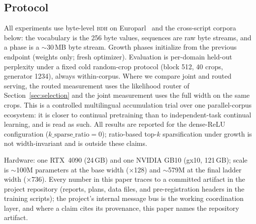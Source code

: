\documentclass[11pt]{article}
\theoremstyle{definition}\newtheorem{definition}{Definition}
\theoremstyle{remark}\newtheorem{remark}{Remark}
\newcommand{\BDH}{\textsc{bdh}}
\begin{document}
\subsection{Protocol}
\label{sec:protocol}

All experiments use byte-level \BDH{} on Europarl~\cite{europarl} and the cross-script corpora below: the vocabulary is the 256 byte values, sequences are
raw byte streams, and a phase is a $\sim$30\,MB byte stream. Growth phases initialize from
the previous endpoint (weights only; fresh optimizer). Evaluation is per-domain held-out
perplexity under a fixed cold random-crop protocol (block 512, 40 crops, generator 1234),
always within-corpus. Where we compare joint and routed serving, the routed measurement uses
the likelihood router of Section~\ref{sec:selection} and the joint measurement uses the full
width on the same crops. This is a controlled multilingual accumulation trial over one parallel-corpus
ecosystem: it is closer to continual pretraining than to independent-task continual learning, and
is read as such. All results are reported for the dense-ReLU configuration
($k\_\mathrm{sparse\_ratio}=0$); ratio-based top-$k$ sparsification under growth is not width-invariant
and is outside these claims.

Hardware: one RTX~4090 (24\,GB) and one NVIDIA GB10 (gx10, 121\,GB); scale is $\sim$100M
parameters at the base width ($\times$128) and $\sim$579M at the final ladder width
($\times$736). Every number in this paper traces to a committed artifact in the project repository
(reports, plans, data files, and pre-registration headers in the training scripts); the
project's internal message bus is the working coordination layer, and where a claim cites
its provenance, this paper names the repository artifact.
\end{document}
